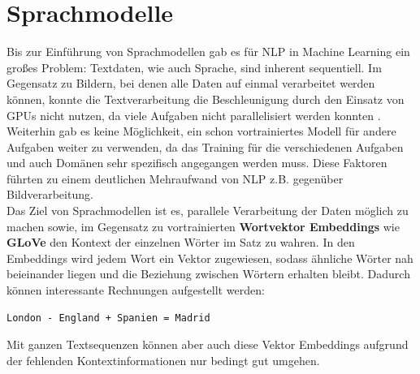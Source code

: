 \chapter{Sprachmodelle}
Bis zur Einf\"uhrung von Sprachmodellen gab es f\"ur NLP in Machine Learning ein gro{\ss}es Problem: Textdaten, wie auch Sprache, sind inherent sequentiell. Im Gegensatz zu Bildern, bei denen alle Daten auf einmal verarbeitet werden k\"onnen, konnte die Textverarbeitung die Beschleunigung durch den Einsatz von GPUs nicht nutzen, da viele Aufgaben nicht parallelisiert werden konnten \cite{attention}.\\ Weiterhin gab es keine M\"oglichkeit, ein schon vortrainiertes Modell f\"ur andere Aufgaben weiter zu verwenden, da das Training f\"ur die verschiedenen Aufgaben und auch Dom\"anen sehr spezifisch angegangen werden muss. Diese Faktoren f\"uhrten zu einem deutlichen Mehraufwand von NLP z.B. gegen\"uber Bildverarbeitung.\\
Das Ziel von Sprachmodellen ist es, parallele Verarbeitung der Daten m\"oglich zu machen sowie, im Gegensatz zu vortrainierten \textbf{Wortvektor Embeddings} wie \textbf{GLoVe} den Kontext der einzelnen W\"orter im Satz zu wahren. In den Embeddings wird jedem Wort ein Vektor zugewiesen, sodass \"ahnliche W\"orter nah beieinander liegen und die Beziehung zwischen W\"ortern erhalten bleibt. Dadurch k\"onnen interessante Rechnungen aufgestellt werden:
\begin{verbatim} 
London - England + Spanien = Madrid
\end{verbatim} 
Mit ganzen Textsequenzen k\"onnen aber auch diese Vektor Embeddings aufgrund der fehlenden Kontextinformationen nur bedingt gut umgehen.

